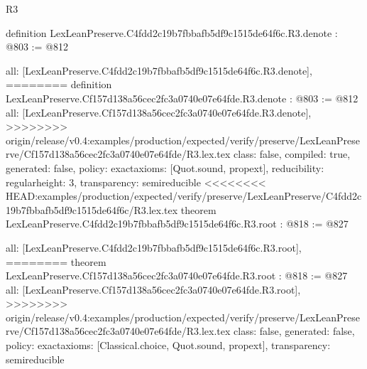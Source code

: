 \begin{lexlean}{R3}
\begin{coremodule}
{{{{{{definition LexLeanPreserve.C4fdd2c19b7fbbafb5df9c1515de64f6c.R3.denote : @803 := @812 {
  all: [LexLeanPreserve.C4fdd2c19b7fbbafb5df9c1515de64f6c.R3.denote],
========
definition LexLeanPreserve.Cf157d138a56cec2fc3a0740e07e64fde.R3.denote : @803 := @812 {
  all: [LexLeanPreserve.Cf157d138a56cec2fc3a0740e07e64fde.R3.denote],
>>>>>>>> origin/release/v0.4:examples/production/expected/verify/preserve/LexLeanPreserve/Cf157d138a56cec2fc3a0740e07e64fde/R3.lex.tex
  class: false,
  compiled: true,
  generated: false,
  policy: exact{axioms: [Quot.sound, propext]},
  reducibility: regular{height: 3},
  transparency: semireducible
}
<<<<<<<< HEAD:examples/production/expected/verify/preserve/LexLeanPreserve/C4fdd2c19b7fbbafb5df9c1515de64f6c/R3.lex.tex
theorem LexLeanPreserve.C4fdd2c19b7fbbafb5df9c1515de64f6c.R3.root : @818 := @827 {
  all: [LexLeanPreserve.C4fdd2c19b7fbbafb5df9c1515de64f6c.R3.root],
========
theorem LexLeanPreserve.Cf157d138a56cec2fc3a0740e07e64fde.R3.root : @818 := @827 {
  all: [LexLeanPreserve.Cf157d138a56cec2fc3a0740e07e64fde.R3.root],
>>>>>>>> origin/release/v0.4:examples/production/expected/verify/preserve/LexLeanPreserve/Cf157d138a56cec2fc3a0740e07e64fde/R3.lex.tex
  class: false,
  generated: false,
  policy: exact{axioms: [Classical.choice, Quot.sound, propext]},
  transparency: semireducible
}

}}}}}}}}
\end{coremodule}
\end{lexlean}
